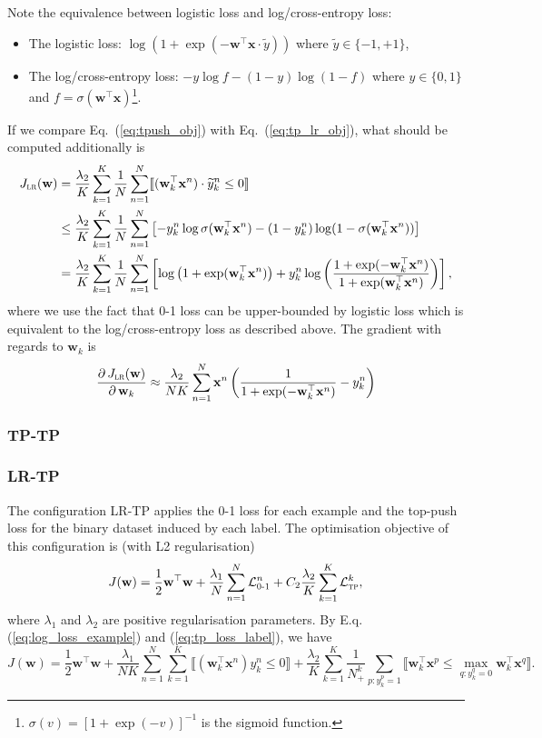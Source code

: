 \documentclass[9pt]{extarticle}
\newcommand{\llb}{\llbracket}
\newcommand{\rrb}{\rrbracket}
\newcommand{\x}{\mathbf{x}}
\newcommand{\1}{\mathbf{1}}
\newcommand{\w}{\mathbf{w}}
\newcommand{\LCal}{\mathcal{L}}
\begin{document}
Note the equivalence between logistic loss and log/cross-entropy loss:
\begin{itemize}
\item The logistic loss: $\log(1 + \exp(-\w^\top \x \cdot \widetilde{y}))$ where $\widetilde{y} \in \{-1, +1\}$,
\item The log/cross-entropy loss: $ -y \log f - (1-y) \log(1-f)$ where $y \in \{0, 1\}$ and $f = \sigma(\w^\top \x)$\footnote{
$\sigma(v) = [1 + \exp(-v)]^{-1}$ is the sigmoid function.}.
\end{itemize}

If we compare Eq.~(\ref{eq:tpush_obj}) with Eq.~(\ref{eq:tp_lr_obj}), what should be computed additionally is
\begin{align*}
J_\textsc{lr}(\w) 
&= \frac{\lambda_2}{K} \sum_{k=1}^K \frac{1}{N} \sum_{n=1}^N \llb (\w_k^\top \x^n) \cdot \widetilde{y}_k^n \le 0 \rrb \\
&\le \frac{\lambda_2}{K} \sum_{k=1}^K \frac{1}{N} \sum_{n=1}^N 
     \left[ -y_k^n \log \sigma(\w_k^\top \x^n) - (1 - y_k^n) \log (1 - \sigma(\w_k^\top \x^n)) \right] \\
&= \frac{\lambda_2}{K} \sum_{k=1}^K \frac{1}{N} \sum_{n=1}^N
   \left[ \log \left( 1 + \exp(\w_k^\top \x^n) \right) + 
          y_k^n \log \left( \frac{1 + \exp(-\w_k^\top \x^n)} {1 + \exp(\w_k^\top \x^n)} \right) \right],
\end{align*}
where we use the fact that 0-1 loss can be upper-bounded by logistic loss which is equivalent to the log/cross-entropy loss as described above.
The gradient with regards to $\w_k$ is
$$
\frac{\partial \, J_\textsc{lr}(\w)} {\partial \, \w_k}
\approx \frac{\lambda_2}{NK} \sum_{n=1}^N \x^n \left( \frac{1}{1 + \exp(-\w_k^\top \x^n)} - y_k^n \right)
$$


\subsubsection{TP-TP}
\label{sssec:tp_tp}


\subsubsection{LR-TP}
\label{sssec:lr_tp}

The configuration LR-TP applies the 0-1 loss for each example and the top-push loss for the binary dataset induced by each label.
The optimisation objective of this configuration is (with L2 regularisation)
$$
J(\w) = \frac{1}{2} \w^\top \w + \frac{\lambda_1}{N} \sum_{n=1}^N \LCal_\textsc{0-1}^n + C_2 \frac{\lambda_2}{K} \sum_{k=1}^K \LCal_\textsc{tp}^k,
$$
where $\lambda_1$ and $\lambda_2$ are positive regularisation parameters.
By E.q. (\ref{eq:log_loss_example}) and (\ref{eq:tp_loss_label}), we have
$$
J(\w) 
= \frac{1}{2} \w^\top \w + 
  \frac{\lambda_1}{NK} \sum_{n=1}^N \sum_{k=1}^K \llb (\w_k^\top \x^n) y_k^n \le 0 \rrb +
  \frac{\lambda_2}{K} \sum_{k=1}^K \frac{1}{N_+^k} \sum_{p: y_k^p=1} \llb \w_k^\top \x^p \le \max_{q: y_k^q=0} \w_k^\top \x^q \rrb.
$$
\end{document}
